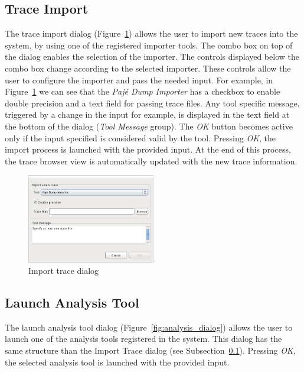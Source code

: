 \documentclass[twoside]{article}
\begin{document}
\begin{sloppypar}
\subsection{Trace Import}
\label{subsec:import}

The trace import dialog (Figure~\ref{fig:import_dialog}) allows the user to import new traces into the system, by using one of the registered importer tools.
The combo box on top of the dialog enables the selection of the importer.
The controls displayed below the combo box change according to the selected importer.
These controls allow the user to configure the importer and pass the needed input.
For example, in Figure~\ref{fig:import_dialog} we can see that the \emph{Pajé Dump Importer} has a checkbox to enable double precision and a text field for passing trace files.
Any tool specific message, triggered by a change in the input for example, is displayed in the text field at the bottom of the dialog (\emph{Tool Message} group).
The \emph{OK} button becomes active only if the input specified is considered valid by the tool. 
Pressing \emph{OK}, the import process is launched with the provided input.
At the end of this process, the trace browser view is automatically updated with the new trace information.

\begin{figure}[h!]
  \centering
    \includegraphics[width=0.5\textwidth]{images/import_dialog.png}
  \caption{Import trace dialog}
  \label{fig:import_dialog}
\end{figure}

\subsection{Launch Analysis Tool}
\label{subsec:analysis}

The launch analysis tool dialog (Figure~\ref{fig:analysis_dialog}) allows the user to launch one of the analysis tools registered in the system.
This dialog has the same structure than the Import Trace dialog (see Subsection~\ref{subsec:import}). 
Pressing \emph{OK}, the selected analysis tool is launched with the provided input. 


\end{sloppypar}
\end{document}
